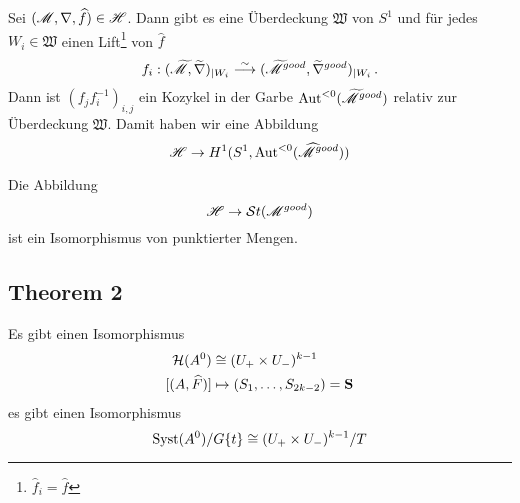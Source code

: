 Sei $(\mathscr{M},\nabla,\widehat f)\in\mathscr{H}$. Dann gibt es eine Überdeckung
$\mathfrak{W}$ von $S^1$ und für jedes $W_i\in\mathfrak{W}$ einen
Lift\footnote{$\hat f_i=\hat f$} von $\hat f$
\[
  f_i:(\widetilde{\mathscr{M}},\widetilde\nabla)_{|W_i}
  \overset{\sim}{\longrightarrow}
  (\widetilde{\mathscr{M}}^{good},\widetilde\nabla^{good})_{|W_i} \,.
\]
Dann ist $(f_jf_i^{-1})_{i,j}$ ein Kozykel in der Garbe
$\operatorname{Aut}^{<0}(\widetilde{\mathscr{M}}^{good})$ relativ zur Überdeckung $\mathfrak{W}$.
Damit haben wir eine Abbildung
\[
  \mathscr{H}\to H^1(S^1,\operatorname{Aut}^{<0}(\widehat {\mathscr{M}}^{good}))
\]
\begin{tthm}
  Die Abbildung
  \[
    \mathscr{H}\to\mathcal{S}{}t(\mathscr{M}^{good})
  \]
  ist ein Isomorphismus von punktierter Mengen.
\end{tthm}
\subsection{Theorem 2} %

\begin{tthm}
  Es gibt einen Isomorphismus
  \begin{align*}
    \cH(A^0)&\cong(U_+\times U_-)^{k-1}
  \\ [(A,\hat F)]&\mapsto(S_1,\dots,S_{2k-2})=\textbf{S}
  \end{align*}
  es gibt einen Isomorphismus
  \[
    \operatorname{Syst}(A^0)/G\{t\}\cong(U_+\times U_-)^{k-1}/T
  \]
\end{tthm}

